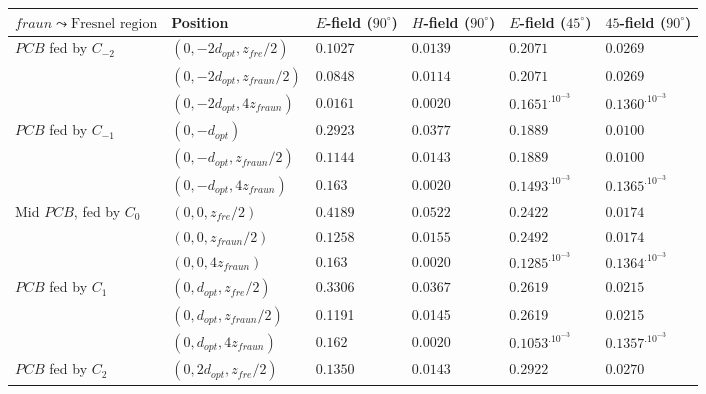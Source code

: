\documentclass[10pt,a4paper,twocolumn]{article}
\begin{document}
{\begin{table}[bt!]
\begin{center}
{\begin{tabular}{||m{4cm}|m{2.6cm}|m{2cm}|m{2cm}|m{2.3cm}|m{2.3cm}||}
				$fraun\leadsto\text{Fresnel region}$
			
				& Position & $E$-field ($90^\circ$) & $H$-field ($90^\circ$) & $E$-field ($45^\circ$) & $45$-field ($90^\circ$) \\
				\hline 
				\cellcolor{pink}$PCB$ fed by $C_{-2}$ & $(0,-2d_{opt},z_{fre}/2)$ & $0.1027$ & $0.0139$ & $0.2071$ & $0.0269$ \\ 
				\cellcolor{pink} &  $(0,-2d_{opt},z_{fraun}/2)$ & $0.0848$ & $0.0114$ &$0.2071$	 & $0.0269$ \\
				\cellcolor{pink} & $(0,-2d_{opt},4z_{fraun})$& $0.0161$& $0.0020$ &$0.1651^.10^{-3}$ & $0.1360^.10^{-3}$ \\
				\hline
				\cellcolor{GreenYellow} $PCB$ fed by $C_{-1}$ & $(0,-d_{opt})$ & $0.2923$ & $0.0377$ & $0.1889$ & $0.0100$ \\
				\cellcolor{GreenYellow} &$(0,-d_{opt},z_{fraun}/2)$ &$0.1144$ & $0.0143$&$0.1889$ & $0.0100$\\
					\cellcolor{GreenYellow} & $(0,-d_{opt},4z_{fraun})$& $0.163$& $0.0020$& $0.1493^.10^{-3}$& $0.1365^.10^{-3}$\\
				\hline
			\cellcolor{pink}	Mid $PCB$, fed by $C_{0}$ & $(0,0,z_{fre}/2)$& $0.4189$& $0.0522$& $0.2422$ & $0.0174$ \\
			\cellcolor{pink} & $(0,0,z_{fraun}/2)$& $0.1258$& $0.0155$& $0.2492$& $0.0174$\\
				\cellcolor{pink} & $(0,0,4z_{fraun})$ & $0.163$& $0.0020$& $0.1285^.10^{-3}$& $0.1364^.10^{-3}$\\
				\hline 
				\cellcolor{GreenYellow} $PCB$ fed by $C_{1}$ & $(0,d_{opt},z_{fre}/2)$ & $0.3306$ & $0.0367$ & $0.2619$ & $0.0215$ \\
				\cellcolor{GreenYellow} & $(0,d_{opt},z_{fraun}/2)$& 0.1191& 0.0145&0.2619& 0.0215\\
					\cellcolor{GreenYellow} & $(0,d_{opt},4z_{fraun})$& $0.162$& $0.0020$& $0.1053^.10^{-3}$& $0.1357^.10^{-3}$\\
				\hline 
				\cellcolor{pink} $PCB$ fed by $C_{2}$& $(0,2d_{opt},z_{fre}/2)$ & $0.1350$ & $0.0143$ & $0.2922$ & $0.0270$ \\

\end{tabular}}
\end{center}
\end{table}}
\end{document}
